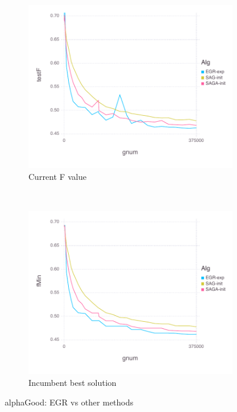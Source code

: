 \documentclass[11pt]{article}
\begin{document}
   \begin{figure}[H]
       \centering
       \begin{subfigure}[b]{0.45\textwidth}
           \includegraphics[width=\textwidth]{Figures/alphaGoodBLtrueFfFinal-g.pdf}
           \caption{Current F value}
       \end{subfigure}
       ~ %
         \begin{subfigure}[b]{0.45\textwidth}
             \includegraphics[width=\textwidth]{Figures/alphaGoodBLtrueFminfFinal-g.pdf}
             \caption{Incumbent best solution}
         \end{subfigure}
       \caption{alphaGood: EGR vs other methods}\label{fig:alphaGoodom}
   \end{figure}
   
\end{document}
